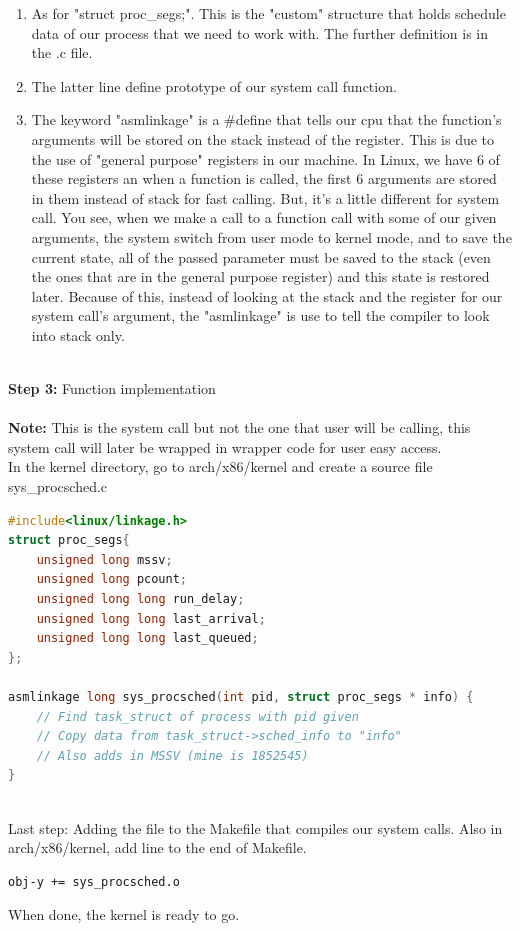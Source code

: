 \documentclass[a4paper]{article}
\begin{document}
\begin{enumerate}
\item As for "struct proc\_segs;". This is the "custom" structure that holds schedule data of our process that we need to work with. The further definition is in the .c file.
\item The latter line define prototype of our system call function. \item The keyword "asmlinkage" is a \#define that tells our cpu that the function's arguments will be stored on the stack instead of the register. This is due to the use of "general purpose" registers in our machine. In Linux, we have 6 of these registers an when a function is called, the first 6 arguments are stored in them instead of stack for fast calling. But, it's a little different for system call. You see, when we make a call to a function call with some of our given arguments, the system switch from user mode to kernel mode, and to save the current state, all of the passed parameter must be saved to the stack (even the ones that are in the general purpose register) and this state is restored later. Because of this, instead of looking at the stack and the register for our system call's argument, the "asmlinkage" is use to tell the compiler to look into stack only.
\end{enumerate}\ \\
\textbf{Step 3:} Function implementation\\\\
\textbf{Note:} This is the system call but not the one that user will be calling, this system call will later be wrapped in wrapper code for user easy access.\\
In the kernel directory, go to arch/x86/kernel and create a source file sys\_procsched.c
\begin{lstlisting}[language=c]
#include<linux/linkage.h>
struct proc_segs{
	unsigned long mssv;
	unsigned long pcount;
	unsigned long long run_delay;
	unsigned long long last_arrival;
	unsigned long long last_queued;
};

asmlinkage long sys_procsched(int pid, struct proc_segs * info) {
	// Find task_struct of process with pid given
	// Copy data from task_struct->sched_info to "info"
	// Also adds in MSSV (mine is 1852545)
}
	
\end{lstlisting}
Last step: Adding the file to the Makefile that compiles our system calls. Also in arch/x86/kernel, add line to the end of Makefile.
\begin{lstlisting}[language=bash]
obj-y += sys_procsched.o
\end{lstlisting}
When done, the kernel is ready to go.
\end{document}
